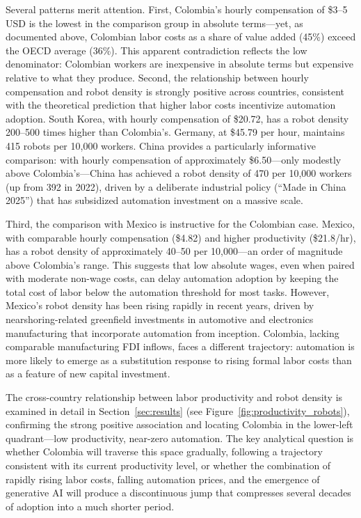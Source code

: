 \documentclass{article}
\begin{document}
Several patterns merit attention. First, Colombia's hourly compensation of \$3--5 USD is the lowest in the comparison group in absolute terms---yet, as documented above, Colombian labor costs as a share of value added (45\%) exceed the OECD average (36\%). This apparent contradiction reflects the low denominator: Colombian workers are inexpensive in absolute terms but expensive relative to what they produce. Second, the relationship between hourly compensation and robot density is strongly positive across countries, consistent with the theoretical prediction that higher labor costs incentivize automation adoption. South Korea, with hourly compensation of \$20.72, has a robot density 200--500 times higher than Colombia's. Germany, at \$45.79 per hour, maintains 415 robots per 10,000 workers. China provides a particularly informative comparison: with hourly compensation of approximately \$6.50---only modestly above Colombia's---China has achieved a robot density of 470 per 10,000 workers (up from 392 in 2022), driven by a deliberate industrial policy (``Made in China 2025'') that has subsidized automation investment on a massive scale.

Third, the comparison with Mexico is instructive for the Colombian case. Mexico, with comparable hourly compensation (\$4.82) and higher productivity (\$21.8/hr), has a robot density of approximately 40--50 per 10,000---an order of magnitude above Colombia's range. This suggests that low absolute wages, even when paired with moderate non-wage costs, can delay automation adoption by keeping the total cost of labor below the automation threshold for most tasks. However, Mexico's robot density has been rising rapidly in recent years, driven by nearshoring-related greenfield investments in automotive and electronics manufacturing that incorporate automation from inception. Colombia, lacking comparable manufacturing FDI inflows, faces a different trajectory: automation is more likely to emerge as a substitution response to rising formal labor costs than as a feature of new capital investment.

The cross-country relationship between labor productivity and robot density is examined in detail in Section~\ref{sec:results} (see Figure~\ref{fig:productivity_robots}), confirming the strong positive association and locating Colombia in the lower-left quadrant---low productivity, near-zero automation. The key analytical question is whether Colombia will traverse this space gradually, following a trajectory consistent with its current productivity level, or whether the combination of rapidly rising labor costs, falling automation prices, and the emergence of generative AI will produce a discontinuous jump that compresses several decades of adoption into a much shorter period.
\end{document}
